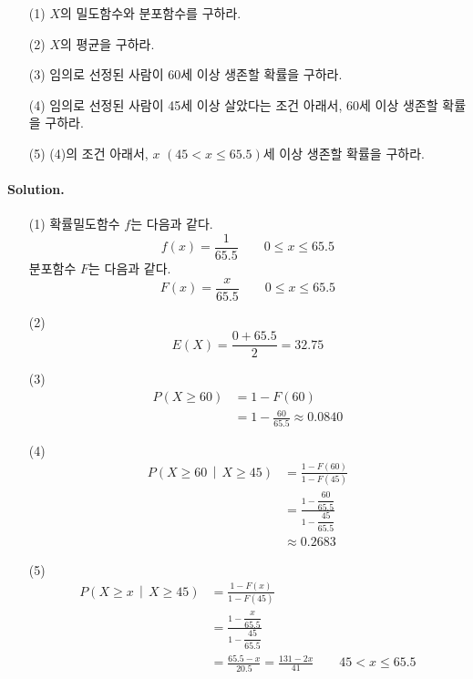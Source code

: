 \begin{itemize}
	\item [(1)] $X$의 밀도함수와 분포함수를 구하라.
	\item [(2)] $X$의 평균을 구하라.
	\item [(3)] 임의로 선정된 사람이 60세 이상 생존할 확률을 구하라.
	\item [(4)] 임의로 선정된 사람이 45세 이상 살았다는 조건 아래서, 60세 이상 생존할 확률을 구하라.
	\item [(5)] (4)의 조건 아래서, $x$ $\left(45 < x \leq 65.5\right)$세 이상 생존할 확률을 구하라.
\end{itemize}

\paragraph{Solution.}

\begin{itemize}
	\item [(1)] {
		확률밀도함수 $f$는 다음과 같다.
		\[f\left(x\right) = \frac{1}{65.5} \qquad 0 \leq x \leq 65.5\]
		분포함수 $F$는 다음과 같다.
		\[F\left(x\right) = \frac{x}{65.5} \qquad 0 \leq x \leq 65.5\]
	}
	\item [(2)] {
		\[E\left(X\right) = \frac{0+65.5}{2} = 32.75\]
	}
	\item [(3)] {
		\begin{align*}
			P\left(X\geq 60\right) &= 1 - F\left(60\right) \\
			&= 1 - \frac{60}{65.5} \approx 0.0840
		\end{align*}
	}
	\item [(4)] {
		\begin{align*}
			P\left(X\geq 60 \,\middle|\, X\geq 45\right) &= \frac{1-F\left(60\right)}{1-F\left(45\right)} \\
			&= \frac{1 - \dfrac{60}{65.5}}{1 - \dfrac{45}{65.5}} \\
			&\approx 0.2683
		\end{align*}
	}
	\item [(5)] {
		\begin{align*}
			P\left(X\geq x \,\middle|\, X\geq 45\right) &= \frac{1-F\left(x\right)}{1-F\left(45\right)} \\
			&= \frac{1 - \dfrac{x}{65.5}}{1 - \dfrac{45}{65.5}} \\
			&= \frac{65.5 - x}{20.5} = \frac{131 - 2x}{41} \qquad 45<x\leq 65.5 \\
		\end{align*}
	}
\end{itemize}
